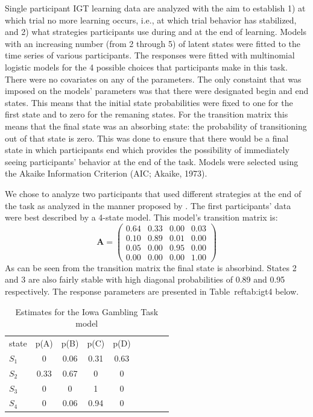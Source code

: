 \documentclass[a4paper,12pt,man,english]{apa} %
\newcommand{\citet}{\citeA}
\newcommand{\mat}{\mathbf}
\begin{document}
Single participant IGT learning data are analyzed with the aim to
establish 1) at which trial no more learning occurs, i.e., at which
trial behavior has stabilized, and 2) what strategies participants use
during and at the end of learning.  Models with an increasing number
(from 2 through 5) of latent states were fitted to the time series of
various participants.  The responses were fitted with multinomial
logistic models for the 4 possible choices that participants make in
this task.  There were no covariates on any of the parameters.  The
only constaint that was imposed on the models' parameters was that
there were designated begin and end states.  This means that the
initial state probabilities were fixed to one for the first state and
to zero for the remaning states.  For the transition matrix this means
that the final state was an absorbing state: the probability of
transitioning out of that state is zero.  This was done to ensure that
there would be a final state in which participants end which provides
the possibility of immediately seeing participants' behavior at the
end of the task.  Models were selected using the Akaike Information
Criterion (AIC; Akaike, 1973).

\nocite{Akaike1973} %

We chose to analyze two participants that used different strategies at
the end of the task as analyzed in the manner proposed by
\citet{Huizenga2007}.  The first participants' data were best
described by a 4-state model.  This model's transition matrix is:
$$
\mat{A} = \begin{pmatrix} 
				0.64 & 0.33 & 0.00 & 0.03 \\
				0.10 & 0.89 & 0.01 & 0.00 \\
				0.05 & 0.00 & 0.95 & 0.00 \\
				0.00 & 0.00 & 0.00 & 1.00
		  \end{pmatrix}
$$
As can be seen from the transition matrix the final state is
absorbind.  States 2 and 3 are also fairly stable with high diagonal
probabilities of 0.89 and 0.95 respectively.  The response parameters
are presented in Table~ref{tab:igt4} below.

\begin{table}
	\caption{Estimates for the Iowa Gambling Task model}
	\label{tab:igt4}
	\begin{tabular}{lcccccccc} \hline
		state & p(A) & p(B) & p(C) & p(D) \\
		$S_1$ & 0    & 0.06 & 0.31 & 0.63 \\
		$S_2$ & 0.33 & 0.67 & 0    & 0 \\ 
		$S_3$ & 0    & 0    & 1    & 0 \\
		$S_4$ & 0    & 0.06 & 0.94 & 0 
	\end{tabular}
\end{table}
\end{document}

